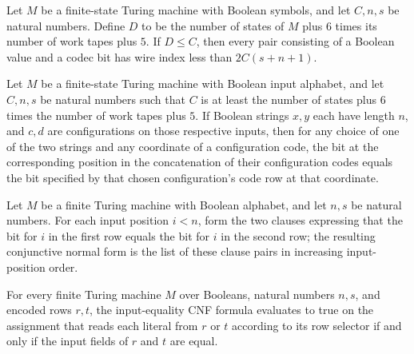 \begin{theorem}
\label{Complexity.codecPairWire_lt}
\leanok
{}
Let $M$ be a finite-state Turing machine with Boolean symbols, and let $C,n,s$ be
natural numbers. Define $D$ to be the number of states of $M$ plus $6$ times its number
of work tapes plus $5$. If $D\le C$, then every pair consisting of a Boolean value and a
codec bit has wire index less than $2C(s+n+1)$.
\end{theorem}

\begin{theorem}
\label{Complexity.configurationCodec_pair_get}
\leanok
{}
Let $M$ be a finite-state Turing machine with Boolean input alphabet, and let $C,n,s$ be
natural numbers such that $C$ is at least the number of states plus $6$ times the number
of work tapes plus $5$. If Boolean strings $x,y$ each have length $n$, and $c,d$ are
configurations on those respective inputs, then for any choice of one of the two strings
and any coordinate of a configuration code, the bit at the corresponding position in the
concatenation of their configuration codes equals the bit specified by that chosen
configuration's code row at that coordinate.
\end{theorem}

\begin{definition}
\label{Complexity.codecInputEquality}
\leanok
{}
Let $M$ be a finite Turing machine with Boolean alphabet, and let $n,s$ be natural
numbers. For each input position $i<n$, form the two clauses expressing that the bit for
$i$ in the first row equals the bit for $i$ in the second row; the resulting conjunctive
normal form is the list of these clause pairs in increasing input-position order.
\end{definition}

\begin{theorem}
\label{Complexity.codecInputEquality_eval}
\leanok
{}
For every finite Turing machine $M$ over Booleans, natural numbers $n,s$, and encoded
rows $r,t$, the input-equality CNF formula evaluates to true on the assignment that
reads each literal from $r$ or $t$ according to its row selector if and only if the
input fields of $r$ and $t$ are equal.
\end{theorem}

